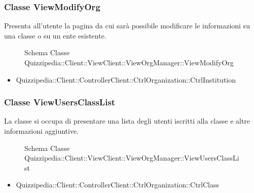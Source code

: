 \subsubsection{Classe ViewModifyOrg}
Presenta all'utente la pagina da cui sarà possibile modificare le informazioni su una classe o su un ente esistente.
\begin{figure}[H]
\centering
\noindent{}
\caption[Schema Classe ViewModifyOrg]{Schema Classe Quizzipedia::Client::ViewClient::ViewOrgManager::ViewModifyOrg}
\end{figure}
\begin{itemize}
\item Quizzipedia::Client::ControllerClient::CtrlOrganization::CtrlInstitution
\end{itemize}
\subsubsection{Classe ViewUsersClassList}
La classe si occupa di presentare una lista degli utenti iscritti alla classe e altre informazioni aggiuntive.
\begin{figure}[H]
\centering
\noindent{}
\caption[Schema Classe ViewUsersClassList]{Schema Classe Quizzipedia::Client::ViewClient::ViewOrgManager::ViewUsersClassList}
\end{figure}
\begin{itemize}
\item Quizzipedia::Client::ControllerClient::CtrlOrganization::CtrlClass
\end{itemize}

